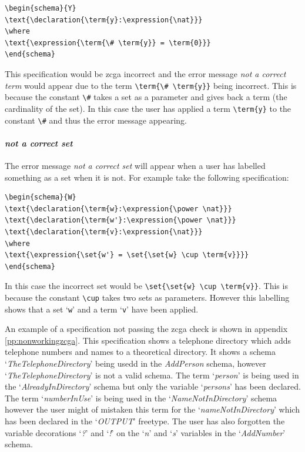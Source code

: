 \begin{exam}
\begin{verbatim}       
\begin{schema}{Y}
\text{\declaration{\term{y}:\expression{\nat}}}
\where
\text{\expression{\term{\# \term{y}} = \term{0}}}
\end{schema}
\end{verbatim}
\end{exam}

This specification would be \gls{zcga} incorrect and the error message \emph{not a correct term} would appear due to the term \verb|\term{\# \term{y}}| being incorrect. This is because the constant \verb|\#| takes a set as a parameter and gives back a term (the cardinality of the set). In this case the user has applied a term \verb|\term{y}| to the constant \verb|\#| and thus the error message appearing.

\paragraph{\emph{not a correct set}}

The error message \emph{not a correct set} will appear when a user has labelled something as a set when it is not. For example take the following specification:

\begin{exam}
\begin{verbatim}       
\begin{schema}{W}
\text{\declaration{\term{w}:\expression{\power \nat}}}
\text{\declaration{\term{w'}:\expression{\power \nat}}}
\text{\declaration{\term{v}:\expression{\nat}}}
\where
\text{\expression{\set{w'} = \set{\set{w} \cup \term{v}}}}
\end{schema}
\end{verbatim}
\end{exam}

In this case the incorrect set would be \verb|\set{\set{w} \cup \term{v}}|. This is because the constant \verb|\cup| takes two sets as parameters. However this labelling shows that a set `\verb|w|' and a term `\verb|v|' have been applied. 

An example of a specification not passing the \gls{zcga} check is shown in appendix \ref{pp:nonworkingzcga}. This specification shows a telephone directory which adds telephone numbers and names to a theoretical directory. It shows a schema `\emph{TheTelephoneDirectory}' being usedd in the \emph{AddPerson} schema, however `\emph{TheTelephoneDirectory}' is not a valid schema. The term `\emph{person}' is being used in the `\emph{AlreadyInDirectory}' schema but only the variable `\emph{persons}' has been declared. The term `\emph{numberInUse}' is being used in the `\emph{NameNotInDirectory}' schema however the user might of mistaken this term for the `\emph{nameNotInDirectory}' which has been declared in the `\emph{OUTPUT}' freetype. The user has also forgotten the variable decorations `\emph{?}' and `\emph{!}' on the `\emph{n}' and `\emph{s}' variables in the `\emph{AddNumber}' schema.

